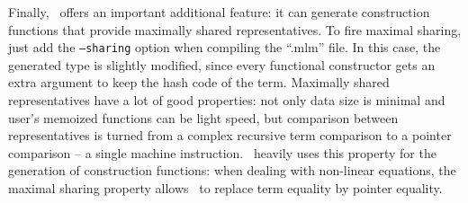Finally, \moca\ offers an important additional feature: it can
generate construction functions that provide maximally shared
representatives. To fire maximal sharing, just add the {\tt --sharing}
option when compiling the ``.mlm'' file. In this case, the generated
type is slightly modified, since every functional constructor gets an
extra argument to keep the hash code of the term. Maximally shared
representatives have a lot of good properties: not only data size is
minimal and user's memoized functions can be light speed, but
comparison between representatives is turned from a complex recursive
term comparison to a pointer comparison -- a single machine
instruction. \moca\ heavily uses this property for the generation of
construction functions: when dealing with non-linear equations, the
maximal sharing property allows \moca\ to replace term equality by
pointer equality.
